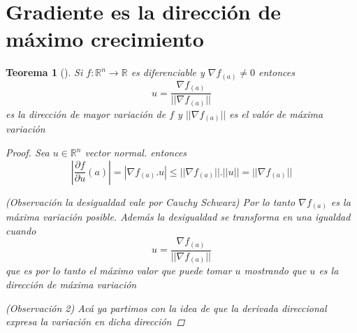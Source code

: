 \documentclass{article}
\theoremstyle{break}
\newtheorem{theorem}{Teorema}[section]
\begin{document}
\section{Gradiente es la dirección de máximo crecimiento}
\begin{theorem}[]
  Si $f:\mathbb{R}^{n} \longrightarrow \mathbb{R}$ es diferenciable y $\nabla f_{(a)} \neq 0$ entonces 
  $$u = \frac{\nabla f_{(a)}}{||\nabla f_{(a)}||}$$ es la dirección de mayor variación de $f$ y $||\nabla f_{(a)}||$ es el valór de máxima
  variación
  \begin{proof}
    Sea $u \in \mathbb{R}^{n} $ vector normal. entonces 
    $$|\frac{\partial f}{\partial u}(a)|= |\nabla f_{(a)}.u| \leq ||\nabla f_{(a)}||.||u|| = ||\nabla f_{(a)}||$$

    (Observación la desigualdad vale por Cauchy Schwarz) Por lo tanto $\nabla f_{(a)}$ es la máxima variación posible. Además la
    desigualdad se transforma en una igualdad cuando $$u = \frac{\nabla f_{(a)}}{||\nabla f_{(a)}||}$$ que es por lo tanto
    el máximo valor que puede tomar $u$ mostrando que $u$ es la dirección de máxima variación

    (Observación 2) Acá ya partimos con la idea de que la derivada direccional expresa la variación en dicha dirección
  \end{proof}
\end{theorem}
\end{document}
